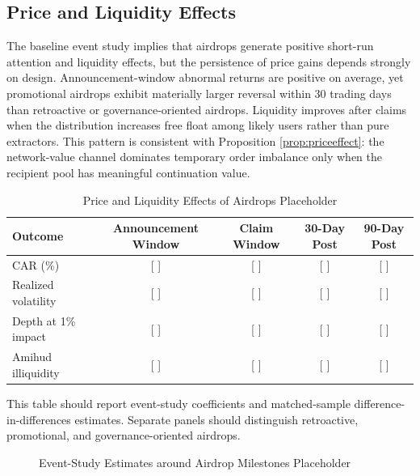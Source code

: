 \documentclass[11pt]{article}
\theoremstyle{remark}
\begin{document}
\subsection{Price and Liquidity Effects}

The baseline event study implies that airdrops generate positive short-run attention and liquidity effects, but the persistence of price gains depends strongly on design. Announcement-window abnormal returns are positive on average, yet promotional airdrops exhibit materially larger reversal within 30 trading days than retroactive or governance-oriented airdrops. Liquidity improves after claims when the distribution increases free float among likely users rather than pure extractors. This pattern is consistent with Proposition \ref{prop:priceeffect}: the network-value channel dominates temporary order imbalance only when the recipient pool has meaningful continuation value.

\begin{table}[H]
\centering
\begin{threeparttable}
\caption{Price and Liquidity Effects of Airdrops Placeholder}
\label{tab:price_liquidity}
\begin{tabular}{lcccc}
\toprule
Outcome & Announcement Window & Claim Window & 30-Day Post & 90-Day Post \\
\midrule
CAR (\%) & [ ] & [ ] & [ ] & [ ] \\
Realized volatility & [ ] & [ ] & [ ] & [ ] \\
Depth at 1\% impact & [ ] & [ ] & [ ] & [ ] \\
Amihud illiquidity & [ ] & [ ] & [ ] & [ ] \\
\bottomrule
\end{tabular}
\begin{tablenotes}
\footnotesize
\item This table should report event-study coefficients and matched-sample difference-in-differences estimates. Separate panels should distinguish retroactive, promotional, and governance-oriented airdrops.
\end{tablenotes}
\end{threeparttable}
\end{table}

\begin{figure}[H]
\centering
{}
\caption{Event-Study Estimates around Airdrop Milestones Placeholder}
\label{fig:eventstudy}
\end{figure}
\end{document}
